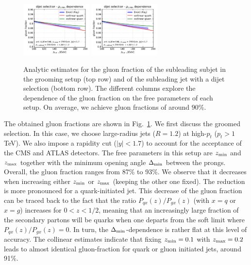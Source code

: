 \documentclass[a4paper,11pt]{article}
\newcommand{\zmin}{z_{\rm{min}}}
\newcommand{\zmax}{z_{\rm{max}}}
\begin{document}
\begin{figure}
   \includegraphics[page=2, width=0.32\textwidth]{born-fractions.pdf}
   \includegraphics[page=3, width=0.32\textwidth]{born-fractions.pdf} 
    \caption{Analytic estimates for the gluon fraction of the subleading subjet in the grooming setup (top row) and of the subleading jet with a dijet selection (bottom row). The different columns explore the dependence of the gluon fraction on the free parameters of each setup. On average, we achieve gluon fractions of around $90\%$.}
    \label{fig:gfrac-analytics}
\end{figure}

The obtained gluon fractions are shown in Fig.~\ref{fig:gfrac-analytics}. We first discuss the groomed selection. In this case, we choose large-radius jets ($R=1.2$) at high-$p_t$ ($p_t> 1$ TeV). We also impose a rapidity cut ($|y|<1.7$) to account for the acceptance of the CMS and ATLAS detectors. The free parameters in this setup are $\zmin$ and $\zmax$ together with the minimum opening angle $\Delta_{\rm min}$ between the prongs. Overall, the gluon fraction ranges from 87\% to 93\%. We observe that it decreases when increasing either $\zmin$ or $\zmax$ (keeping the other one fixed). The reduction is more pronounced for a quark-initiated jet. This decrease of the gluon fraction can be traced back to the fact that the ratio $P_{qx}(z)/P_{gx}(z)$ (with $x=q$ or $x=g$) increases for $0<z<1/2$, meaning that an increasingly large fraction of the secondary partons will be quarks when one departs from the soft limit where $P_{qx}(z)/P_{gx}(z)=0$.
%
In turn, the $\Delta_{\rm min}$-dependence is rather flat at this level of accuracy. The collinear estimates indicate that fixing $\zmin=0.1$ with $\zmax=0.2$ leads to almost identical gluon-fraction for quark or gluon initiated jets, around 91\%.   
\end{document}
